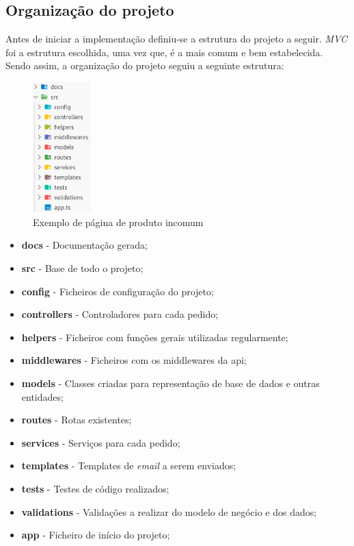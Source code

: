 \subsection{Organização do projeto}
Antes de iniciar a implementação definiu-se a estrutura do projeto a seguir. \textit{MVC} foi a estrutura escolhida, uma vez que, é a mais comum e bem estabelecida. Sendo assim, a organização do projeto seguiu a seguinte estrutura:
\begin{figure}[htb]
  \centering
  \includegraphics[width=0.2\textwidth]{images/implementacao/api/project_organization.png}
  \caption{Exemplo de página de produto incomum}
  \label{fig:63}
\end{figure}

\begin{itemize}
  \item \textbf{docs} - Documentação gerada;
  \item \textbf{src} - Base de todo o projeto;
  \item \textbf{config} - Ficheiros de configuração do projeto;
  \item \textbf{controllers} - Controladores para cada pedido;
  \item \textbf{helpers} - Ficheiros com funções gerais utilizadas regularmente;
  \item \textbf{middlewares} - Ficheiros com os middlewares da api;
  \item \textbf{models} - Classes criadas para representação de base de dados e outras entidades;
  \item \textbf{routes} - Rotas existentes;
  \item \textbf{services} - Serviços para cada pedido;
  \item \textbf{templates} - Templates de \textit{email} a serem enviados;
  \item \textbf{tests} - Testes de código realizados;
  \item \textbf{validations} - Validações a realizar do modelo de negócio e dos dados;
  \item \textbf{app} - Ficheiro de início do projeto;
\end{itemize}